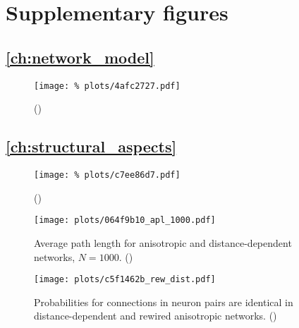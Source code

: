 





\section{Supplementary figures}\label{sec:supp_figures}

\subsection*{\autoref{ch:network_model}}

\begin{figure}[H]
  \centering
  \texttt{[image: \%
    plots/4afc2727.pdf]}
  \caption{()}
  \label{suppfig:rew_stats}
\end{figure}


\subsection*{\autoref{ch:structural_aspects}}

\begin{figure}[H]
  \centering
  \texttt{[image: \%
    plots/c7ee86d7.pdf]}
  \caption{()}
  \label{suppfig:out_degree}
\end{figure}


\begin{figure}[htp]
  \centering
  \texttt{[image: plots/064f9b10\_apl\_1000.pdf]}
  \caption{Average path length for anisotropic and distance-dependent
    networks, $N=1000$. ()} %
  \label{suppfig:small_world}
\end{figure}


\begin{figure}[htp]
  \centering
  \texttt{[image: plots/c5f1462b\_rew\_dist.pdf]}
  \caption{Probabilities for connections in neuron pairs are identical
    in distance-dependent and rewired anisotropic
    networks. ()} %
  \label{suppfig:two_neurons_dist_rew}
  \end{figure}



